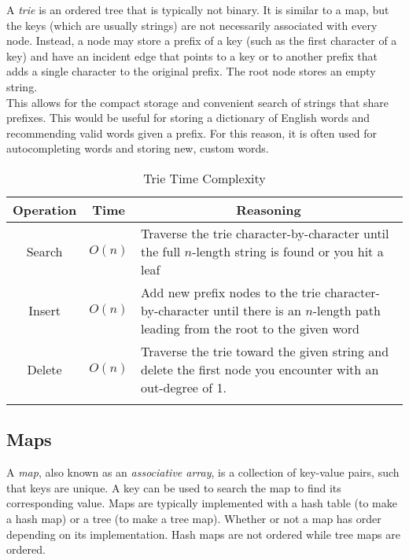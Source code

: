 A \textit{trie} is an ordered tree that is typically not binary. It is similar to a map, but the keys (which are usually strings) are not necessarily associated with every node. Instead, a node may store a prefix of a key (such as the first character of a key) and have an incident edge that points to a key or to another prefix that adds a single character to the original prefix. The root node stores an empty string.\\

This allows for the compact storage and convenient search of strings that share prefixes. This would be useful for storing a dictionary of English words and recommending valid words given a prefix. For this reason, it is often used for autocompleting words and storing new, custom words. \\

\begin{table}[H]
	\caption{Trie Time Complexity}
	\label{tab:trie}
	\begin{tabularx}{\textwidth}{|c|c|X|}
		\vtabularspace{3}
		\hline
		Operation & Time & \multicolumn{1}{c|}{Reasoning} \\
		\hline
		Search & $O(n)$ & Traverse the trie character-by-character until the full $n$-length string is found or you hit a leaf \\
		Insert & $O(n)$ & Add new prefix nodes to the trie character-by-character until there is an $n$-length path leading from the root to the given word \\
		Delete & $O(n)$ & Traverse the trie toward the given string and delete the first node you encounter with an out-degree of 1.\\
		\hline
		\vtabularspace{3}
	\end{tabularx}
\end{table}


\subsection{Maps}

A \textit{map}, also known as an \textit{associative array}, is a collection of key-value pairs, such that keys are unique. A key can be used to search the map to find its corresponding value. Maps are typically implemented with a hash table (to make a hash map) or a tree (to make a tree map). Whether or not a map has order depending on its implementation. Hash maps are not ordered while tree maps are ordered.

